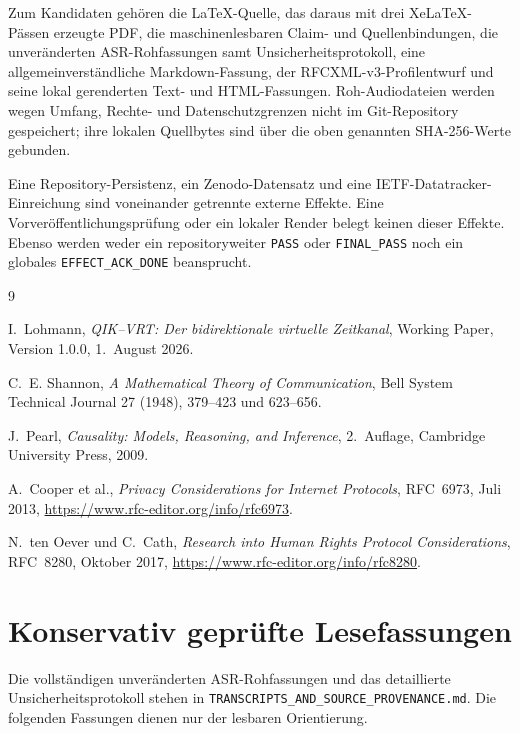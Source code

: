 \documentclass[11pt,a4paper]{article}
\theoremstyle{remark}
\begin{document}
Zum Kandidaten gehören die LaTeX-Quelle, das daraus mit drei XeLaTeX-Pässen
erzeugte PDF, die maschinenlesbaren Claim- und Quellenbindungen, die
unveränderten ASR-Rohfassungen samt Unsicherheitsprotokoll, eine
allgemeinverständliche Markdown-Fassung, der RFCXML-v3-Profilentwurf und seine
lokal gerenderten Text- und HTML-Fassungen. Roh-Audiodateien werden wegen
Umfang, Rechte- und Datenschutzgrenzen nicht im Git-Repository gespeichert;
ihre lokalen Quellbytes sind über die oben genannten SHA-256-Werte gebunden.

Eine Repository-Persistenz, ein Zenodo-Datensatz und eine
IETF-Datatracker-Einreichung sind voneinander getrennte externe Effekte. Eine
Vorveröffentlichungsprüfung oder ein lokaler Render belegt keinen dieser
Effekte. Ebenso werden weder ein repositoryweiter \texttt{PASS} oder
\texttt{FINAL\_PASS} noch ein globales \texttt{EFFECT\_ACK\_DONE}
beansprucht.

\begin{thebibliography}{9}

I.~Lohmann,
\emph{QIK--VRT: Der bidirektionale virtuelle Zeitkanal},
Working Paper, Version 1.0.0, 1.~August 2026.

C.~E. Shannon,
\emph{A Mathematical Theory of Communication},
Bell System Technical Journal 27 (1948), 379--423 und 623--656.

J.~Pearl,
\emph{Causality: Models, Reasoning, and Inference},
2.~Auflage, Cambridge University Press, 2009.

A.~Cooper et al.,
\emph{Privacy Considerations for Internet Protocols},
RFC~6973, Juli 2013, \url{https://www.rfc-editor.org/info/rfc6973}.

N.~ten Oever und C.~Cath,
\emph{Research into Human Rights Protocol Considerations},
RFC~8280, Oktober 2017, \url{https://www.rfc-editor.org/info/rfc8280}.

\end{thebibliography}

\appendix
\section{Konservativ geprüfte Lesefassungen}

Die vollständigen unveränderten ASR-Rohfassungen und das detaillierte
Unsicherheitsprotokoll stehen in
\texttt{TRANSCRIPTS\_AND\_SOURCE\_PROVENANCE.md}. Die folgenden Fassungen
dienen nur der lesbaren Orientierung.
\end{document}
